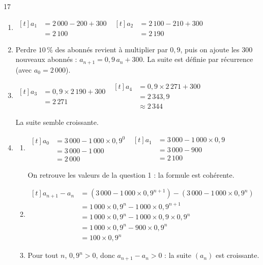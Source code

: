 \documentclass[10pt,a4paper]{article}
\begin{document}
\begin{corr}{17}
\begin{enumerate}[leftmargin=*]
    \item \(\begin{aligned}[t] a_1&=2\,000-200+300\\ &=2\,100\end{aligned}\) \qquad \(\begin{aligned}[t] a_2&=2\,100-210+300\\ &=2\,190\end{aligned}\)
    \item Perdre \(10\,\%\) des abonnés revient à multiplier par \(0,9\), puis on ajoute les \(300\) nouveaux abonnés : \(a_{n+1}=0,9\,a_n+300\). La suite est définie par récurrence (avec \(a_0=2\,000\)).
    \item \(\begin{aligned}[t] a_3&=0,9\times 2\,190+300\\ &=2\,271\end{aligned}\) \qquad \(\begin{aligned}[t] a_4&=0,9\times 2\,271+300\\ &=2\,343,9\\ &\approx 2\,344\end{aligned}\)

    La suite semble croissante.
    \item \begin{enumerate}
        \item \(\begin{aligned}[t] a_0&=3\,000-1\,000\times 0,9^0\\ &=3\,000-1\,000\\ &=2\,000\end{aligned}\) \qquad \(\begin{aligned}[t] a_1&=3\,000-1\,000\times 0,9\\ &=3\,000-900\\ &=2\,100\end{aligned}\)

        On retrouve les valeurs de la question 1 : la formule est cohérente.
        \item \(\begin{aligned}[t] a_{n+1}-a_n&=\left(3\,000-1\,000\times 0,9^{n+1}\right)-\left(3\,000-1\,000\times 0,9^n\right)\\ &=1\,000\times 0,9^n-1\,000\times 0,9^{n+1}\\ &=1\,000\times 0,9^n-1\,000\times 0,9\times 0,9^n\\ &=1\,000\times 0,9^n-900\times 0,9^n\\ &=100\times 0,9^n\end{aligned}\)
        \item Pour tout \(n\), \(0,9^n>0\), donc \(a_{n+1}-a_n>0\) : la suite \((a_n)\) est croissante.
    \end{enumerate}
\end{enumerate}
\end{corr}
\end{document}
